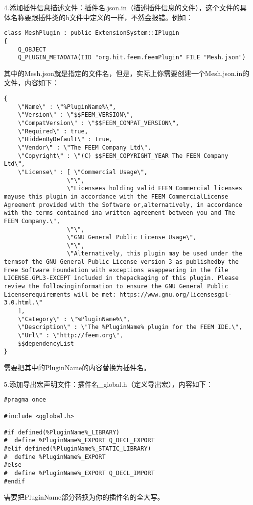 4.添加插件信息描述文件：插件名.json.in（描述插件信息的文件），这个文件的具体名称要跟插件类的h文件中定义的一样，不然会报错。例如：
\begin{lstlisting}
class MeshPlugin : public ExtensionSystem::IPlugin
{
    Q_OBJECT
    Q_PLUGIN_METADATA(IID "org.hit.feem.feemPlugin" FILE "Mesh.json")
\end{lstlisting}
其中的Mesh.json就是指定的文件名，但是，实际上你需要创建一个Mesh.json.in的文件，内容如下：
\begin{lstlisting}
{
    \"Name\" : \"%PluginName%\",
    \"Version\" : \"$$FEEM_VERSION\",
    \"CompatVersion\" : \"$$FEEM_COMPAT_VERSION\",
    \"Required\" : true,
    \"HiddenByDefault\" : true,
    \"Vendor\" : \"The FEEM Company Ltd\",
    \"Copyright\" : \"(C) $$FEEM_COPYRIGHT_YEAR The FEEM Company Ltd\",
    \"License\" : [ \"Commercial Usage\",
                  \"\",
                  \"Licensees holding valid FEEM Commercial licenses mayuse this plugin in accordance with the FEEM CommercialLicense Agreement provided with the Software or,alternatively, in accordance with the terms contained ina written agreement between you and The FEEM Company.\",
                  \"\",
                  \"GNU General Public License Usage\",
                  \"\",
                  \"Alternatively, this plugin may be used under the termsof the GNU General Public License version 3 as publishedby the Free Software Foundation with exceptions asappearing in the file LICENSE.GPL3-EXCEPT included in thepackaging of this plugin. Please review the followinginformation to ensure the GNU General Public Licenserequirements will be met: https://www.gnu.org/licensesgpl-3.0.html.\"
    ],
    \"Category\" : \"%PluginName%\",
    \"Description\" : \"The %PluginName% plugin for the FEEM IDE.\",
    \"Url\" : \"http://feem.org\",
    $$dependencyList
}    
\end{lstlisting}
需要把其中的PluginName的内容替换为插件名。

5.添加导出宏声明文件：插件名\_global.h（定义导出宏），内容如下：
\begin{lstlisting}
#pragma once

#include <qglobal.h>

#if defined(%PluginName%_LIBRARY)
#  define %PluginName%_EXPORT Q_DECL_EXPORT
#elif defined(%PluginName%_STATIC_LIBRARY)
#  define %PluginName%_EXPORT
#else
#  define %PluginName%_EXPORT Q_DECL_IMPORT
#endif   
\end{lstlisting}
需要把PluginName部分替换为你的插件名的全大写。

